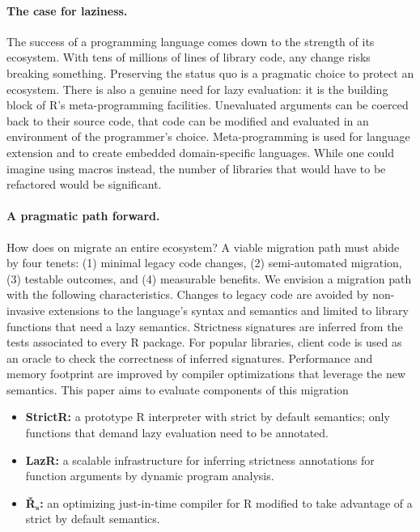 \documentclass[review,creen,acmsmall]{acmart}
\begin{document}
\paragraph{The case for laziness.} The success of a programming language
comes down to the strength of its ecosystem. With tens of millions of lines of
library code, any change risks breaking something. Preserving the status quo is
a pragmatic choice to protect an ecosystem. There is also a genuine need for
lazy evaluation: it is the building block of R's meta-programming facilities.
Unevaluated arguments can be coerced back to their source code, that code can be
modified and evaluated in an environment of the programmer's choice.
Meta-programming is used for language extension and to create embedded
domain-specific languages. While one could imagine using macros instead, the
number of libraries that would have to be refactored would be significant.

\paragraph{A pragmatic path forward.} How does on migrate an entire ecosystem?
A viable migration path must abide by four tenets: (1) minimal legacy code
changes, (2) semi-automated migration, (3) testable outcomes, and (4) measurable
benefits. We envision a migration path with the following characteristics.
Changes to legacy code are avoided by non-invasive extensions to the language's
syntax and semantics and limited to library functions that need a lazy
semantics. Strictness signatures are inferred from the tests associated to every
R package. For popular libraries, client code is used as an oracle to check the
correctness of inferred signatures. Performance and memory footprint are
improved by compiler optimizations that leverage the new semantics. This paper
aims to evaluate components of this migration

\newcommand{\rshstrict}{{\sf {\v R}$_{\mathsf s}$ }} %
\newcommand{\brshstrict}{{\bf {\v R}$_{\mathbf s}$}}

\begin{itemize}[---]
\item {\bf StrictR:} a prototype R interpreter with strict by default
  semantics; only functions that demand lazy evaluation need to be annotated.
\item {\bf LazR:} a scalable infrastructure for inferring strictness annotations
  for function arguments by dynamic program analysis.
\item {\bf \brshstrict:} an optimizing just-in-time compiler for R modified to
  take advantage of a strict by default semantics.
\end{itemize}
\end{document}
